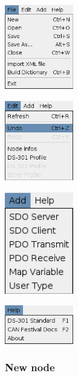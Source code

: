 \documentclass[12pt,english,a4paper]{book}
\begin{document}
\begin{center}
\includegraphics[width=3cm]{Pictures/10000000000000B6000000DF1EDD1E73} 
\par\end{center}

\begin{center}
\includegraphics[width=3cm]{Pictures/10000000000000AC000000C9C3F53FA6} 
\par\end{center}

\begin{center}
\includegraphics[width=3cm]{Pictures/100000000000006D000000A31EC8CB54} 
\par\end{center}

\begin{center}
\includegraphics[width=3cm]{Pictures/10000000000000AA0000006014F74635} 
\par\end{center}


\subsubsection{New node}
\end{document}
